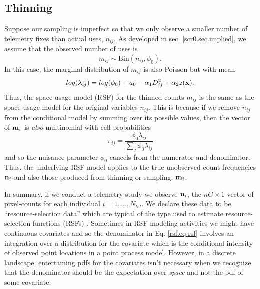 \subsection{Thinning}

Suppose our sampling is imperfect so that we only observe a smaller
number of telemetry fixes than actual uses, $n_{ij}$. As developed in
sec. \ref{scr0.sec.implied}, we assume that the observed number of
uses is
\[
 m_{ij} \sim \mbox{Bin}(n_{ij}, \phi_{0}).
\]
In this case, the marginal distribution of $m_{ij}$ is also Poisson
but with mean
\[
 log(\lambda_{ij}) = log(\phi_{0}) + a_{0} -\alpha_{1} D_{ij}^{2} +  \alpha_{2} z({\bf x}).
\]
Thus, the space-usage model (RSF) for the
thinned counts $m_{ij}$ is the same as the space-usage model for the
original variables $n_{ij}$.  This is because if we remove $n_{ij}$
from the conditional
 model by summing over its possible values, then the vector of
${\bf m}_{i}$ is {\it also}  multinomial with cell probabilities
\[
\pi_{ij} = \frac{\phi_{0}\lambda_{ij}}{\sum_{j} \phi_{0} \lambda_{ij}}
\]
and so the nuisance parameter $\phi_{0}$ cancels from the numerator and
denominator. Thus, the underlying RSF model applies to the true
unobserved count frequencies ${\bf n}_{i}$ and also those produced
from thinning or sampling, ${\bf m}_{i}$.


In summary, if we conduct a telemetry study we observe ${\bf n}_{i}$,
the $nG \times 1$ vector of pixel-counts for each individual
$i=1,\ldots,N_{tel}$.  We declare these data to be
``resource-selection data'' which are typical of the type used to
estimate resource-selection functions (RSFs) \citep{manly_etal:2002}.
Sometimes in RSF modeling activities we might have
continuous covariates and so the denominator in Eq. \ref{rsf.eq.rsf}
involves an integration over a distribution for the covariate which is
the conditional intensity of observed point locations in a point
process model. However, in a discrete landscape, entertaining pdfs for
the covariates isn't necessary \citep{royle_etal:2012mee} when we
recognize that the denominator should be the expectation over {\it
  space} and not the pdf of some covariate.



